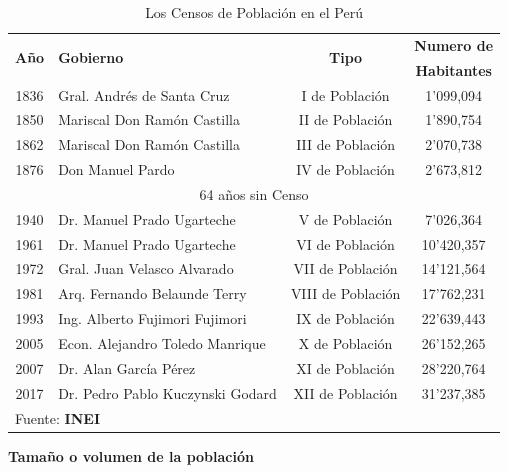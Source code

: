 \documentclass[8pt,a4paper]{beamer}
\begin{document}
{\begin{frame}{}

\begin{table}[!hbt]
\begin{center}
\caption{Los Censos de Población en el Perú}
\label{tab:1}
\begin{tabular}{|c|l|c|c|}
\hline
\multirow{2}{*}{\textbf{Año}} & \multirow{2}{*}{\textbf{Gobierno}} & \multirow{2}{*}{\textbf{Tipo}} & \textbf{Numero de}\\
							 &  & & \textbf{Habitantes}\\
\hline
1836 & Gral. Andrés de Santa Cruz      & I de Población   & 1’099,094 \\\hline
1850 & Mariscal Don Ramón Castilla     & II de Población  & 1’890,754 \\\hline
1862 & Mariscal Don Ramón Castilla     & III de Población & 2’070,738 \\\hline
1876 & Don Manuel Pardo                & IV de Población  & 2’673,812 \\\hline
\multicolumn{4}{|c|}{64 años sin Censo }\\\hline
1940 & Dr. Manuel Prado Ugarteche      & V de Población   & 7’026,364 \\\hline
1961 & Dr. Manuel Prado Ugarteche      & VI de Población  & 10’420,357 \\\hline
1972 & Gral. Juan Velasco Alvarado     & VII de Población & 14’121,564 \\\hline
1981 & Arq. Fernando Belaunde Terry    & VIII de Población & 17’762,231 \\\hline
1993 & Ing. Alberto Fujimori Fujimori  & IX de Población  & 22’639,443 \\\hline
2005 & Econ. Alejandro Toledo Manrique & X de Población   & 26’152,265 \\\hline
2007 & Dr. Alan García Pérez           & XI de Población  & 28’220,764\\\hline
2017 & Dr. Pedro Pablo Kuczynski Godard& XII de Población  & 31’237,385\\\hline
\multicolumn{4}{|l|}{\small Fuente: \textbf{INEI}} \\\hline
\end{tabular}
\end{center}
\end{table}

\end{frame}


\begin{frame}{\textbf{Tamaño o volumen de la población}}


\end{frame}}
\end{document}

